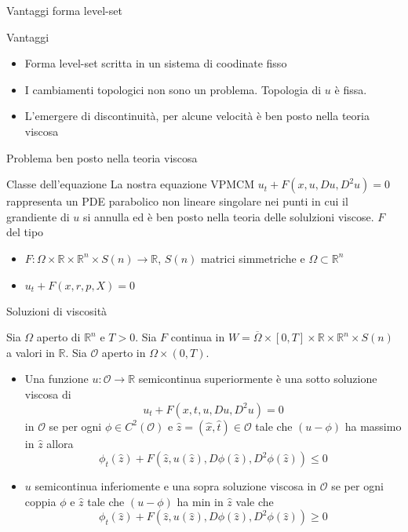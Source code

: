 \begin{frame}{Vantaggi forma level-set}
 \begin{block}{Vantaggi}
   \begin{itemize}
     \item Forma level-set scritta in un sistema di coodinate fisso
     \item I cambiamenti topologici non sono un problema. Topologia di
       $u$ è fissa.
     \item L'emergere di discontinuità, per alcune velocità è ben
       posto nella teoria viscosa
   \end{itemize}
 \end{block}

\end{frame}



\begin{frame}{Problema ben posto nella teoria viscosa}
     \begin{block}{Classe dell'equazione}
       La nostra equazione VPMCM \alert{$u_t+F(x,u,Du,D^2u)=0$}
       rappresenta un PDE parabolico non lineare singolare nei punti in cui
       il grandiente di $u$ si annulla ed è ben posto nella teoria
       delle solulzioni viscose. $F$ del tipo
       \begin{itemize}
         \item $F:\Omega\times\mathbb{R}\times\mathbb{R}^n\times
           S(n)\to\mathbb{R}$, $S(n)$ matrici simmetriche e
           $\Omega\subset\mathbb{R}^n$
         \item $u_t+F(x,r,p,X)=0$
       \end{itemize}
     \end{block}
\end{frame}

\begin{frame}{Soluzioni di viscosità}
  \begin{definizione}
    Sia $\Omega$ aperto di $\mathbb{R}^n$ e $T>0$. Sia $F$ continua in
    $W=\overline{\Omega}\times
    [0,T]\times\mathbb{R}\times\mathbb{R}^n\times S(n)$ a valori in
    $\mathbb{R}$. Sia $\mathcal{O}$ aperto in $\Omega\times(0,T)$.
    \begin{itemize}
      \item Una funzione $u:\mathcal{O}\to\mathbb{R}$ semicontinua
        superiormente è una \alert{sotto
          soluzione viscosa} di 
        \[
        u_t+F(x,t,u,Du,D^2u)=0
        \]
        in $\mathcal{O}$ se per ogni $\phi\in C^2(\mathcal{O})$ e
        $\hat{z}=(\hat{x},\hat{t})\in\mathcal{O}$ tale che $(u-\phi)$ ha
        massimo in $\hat{z}$ allora
        \[
        \phi_t(\hat{z})+F(\hat{z},u(\hat{z}),D\phi(\hat{z}),D^2\phi(\hat{z}))\leq 0
        \]
        \item $u$ semicontinua inferiomente e una \alert{sopra
          soluzione viscosa}  in $\mathcal{O}$ se per ogni coppia
          $\phi$ e $\hat{z}$ tale che $(u-\phi)$ ha min in $\hat{z}$
          vale che
          \[
          \phi_t(\hat{z})+F(\hat{z},u(\hat{z}),D\phi(\hat{z}),D^2\phi(\hat{z}))\geq 0
          \]
        \end{itemize}
  \end{definizione}
\end{frame}

